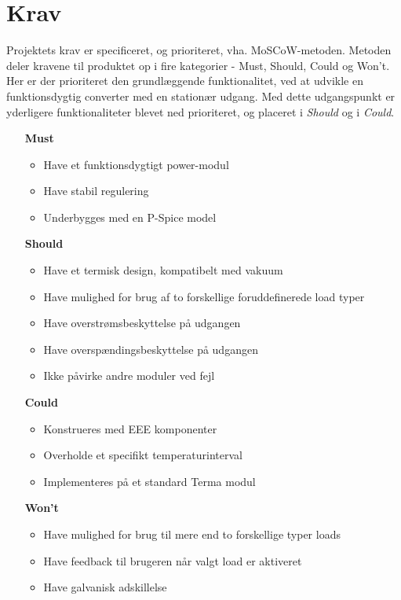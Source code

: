 
\chapter{Krav}
Projektets krav er specificeret, og prioriteret, vha. MoSCoW-metoden\cite{MoSCoW}. Metoden deler kravene til produktet op i fire kategorier - Must, Should, Could og Won't. Her er der prioriteret den grundlæggende funktionalitet, ved at udvikle en funktionsdygtig converter med en stationær udgang. Med dette udgangspunkt er yderligere funktionaliteter blevet ned prioriteret, og placeret i \textit{Should} og i \textit{Could}. 

\begin{itemize}
	\item[\textbf{Must}]
	\begin{itemize}
		\item Have et funktionsdygtigt power-modul
		\item Have stabil regulering
		\item Underbygges med en P-Spice model
		
	\end{itemize}
	\item[\textbf{Should}]
	\begin{itemize}
		\item Have et termisk design, kompatibelt med vakuum
		\item Have mulighed for brug af to forskellige foruddefinerede load typer
		\item Have overstrømsbeskyttelse på udgangen
		\item Have overspændingsbeskyttelse på udgangen
		\item Ikke påvirke andre moduler ved fejl
		
	\end{itemize}
	\item[\textbf{Could}] 
	\begin{itemize}
		\item Konstrueres med EEE komponenter
		\item Overholde et specifikt temperaturinterval
		\item Implementeres på et standard Terma modul 
		
	\end{itemize}
	\item[\textbf{Won't}]
	\begin{itemize}
		\item Have mulighed for brug til mere end to forskellige typer loads
		\item Have feedback til brugeren når valgt load er aktiveret
		\item Have galvanisk adskillelse
		
	\end{itemize}
\end{itemize}

